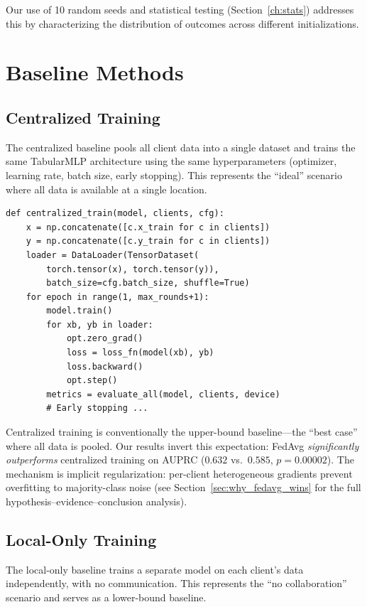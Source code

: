 \documentclass[11pt,a4paper]{report}
\begin{document}
Our use of 10 random seeds and statistical testing (Section~\ref{ch:stats}) addresses this by characterizing the distribution of outcomes across different initializations.


\chapter{Baseline Methods}

\section{Centralized Training}

The centralized baseline pools all client data into a single dataset and trains the same TabularMLP architecture using the same hyperparameters (optimizer, learning rate, batch size, early stopping). This represents the ``ideal'' scenario where all data is available at a single location.

\begin{lstlisting}
def centralized_train(model, clients, cfg):
    x = np.concatenate([c.x_train for c in clients])
    y = np.concatenate([c.y_train for c in clients])
    loader = DataLoader(TensorDataset(
        torch.tensor(x), torch.tensor(y)),
        batch_size=cfg.batch_size, shuffle=True)
    for epoch in range(1, max_rounds+1):
        model.train()
        for xb, yb in loader:
            opt.zero_grad()
            loss = loss_fn(model(xb), yb)
            loss.backward()
            opt.step()
        metrics = evaluate_all(model, clients, device)
        # Early stopping ...
\end{lstlisting}

Centralized training is conventionally the upper-bound baseline---the ``best case'' where all data is pooled. Our results invert this expectation: FedAvg \emph{significantly outperforms} centralized training on AUPRC ($0.632$ vs.\ $0.585$, $p = 0.00002$). The mechanism is implicit regularization: per-client heterogeneous gradients prevent overfitting to majority-class noise (see Section~\ref{sec:why_fedavg_wins} for the full hypothesis--evidence--conclusion analysis).

\section{Local-Only Training}

The local-only baseline trains a separate model on each client's data independently, with no communication. This represents the ``no collaboration'' scenario and serves as a lower-bound baseline.
\end{document}
